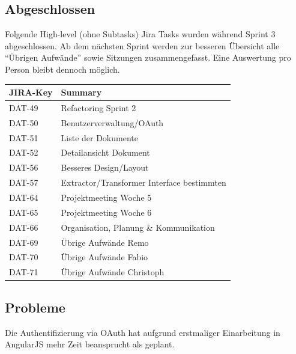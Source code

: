 \subsection{Abgeschlossen}
Folgende High-level (ohne Subtasks) Jira Tasks wurden während Sprint 3 abgeschlossen. Ab dem nächsten Sprint werden zur besseren Übersicht alle ``Übrigen Aufwände'' sowie Sitzungen zusammengefasst. Eine Auswertung pro Person bleibt dennoch möglich.

\begin{table}[H]
\centering
\begin{tabular}{ll}
	\toprule
	\textbf{JIRA-Key} & \textbf{Summary}\\
	\midrule
DAT-49 & Refactoring Sprint 2\\
DAT-50 & Benutzerverwaltung/OAuth\\
DAT-51 & Liste der Dokumente\\
DAT-52 & Detailansicht Dokument\\
DAT-56 & Besseres Design/Layout\\
DAT-57 & Extractor/Transformer Interface bestimmten\\
DAT-64 & Projektmeeting Woche 5\\
DAT-65 & Projektmeeting Woche 6\\
DAT-66 & Organisation, Planung \& Kommunikation\\
DAT-69 & Übrige Aufwände Remo\\
DAT-70 & Übrige Aufwände Fabio\\
DAT-71 & Übrige Aufwände Christoph\\
	\bottomrule
\end{tabular}	
\end{table}

\subsection{Probleme}
Die Authentifizierung via OAuth hat aufgrund erstmaliger Einarbeitung in AngularJS mehr Zeit beansprucht als geplant.
